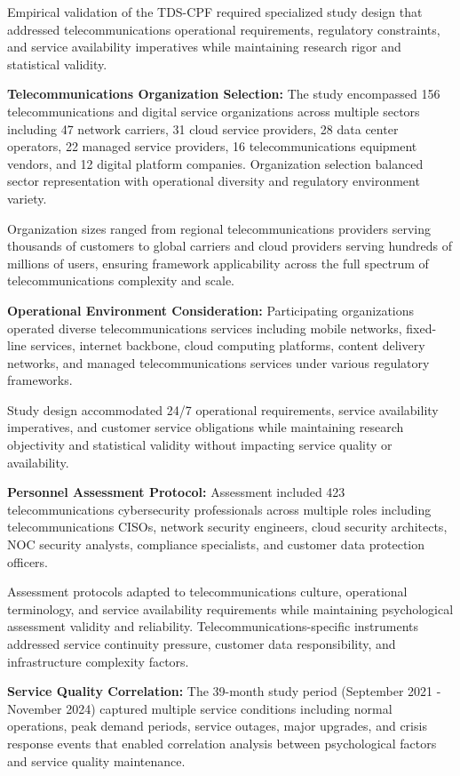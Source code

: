 \documentclass[10pt, twocolumn]{article}
\begin{document}
Empirical validation of the TDS-CPF required specialized study design that addressed telecommunications operational requirements, regulatory constraints, and service availability imperatives while maintaining research rigor and statistical validity.

\textbf{Telecommunications Organization Selection:} The study encompassed 156 telecommunications and digital service organizations across multiple sectors including 47 network carriers, 31 cloud service providers, 28 data center operators, 22 managed service providers, 16 telecommunications equipment vendors, and 12 digital platform companies. Organization selection balanced sector representation with operational diversity and regulatory environment variety.

Organization sizes ranged from regional telecommunications providers serving thousands of customers to global carriers and cloud providers serving hundreds of millions of users, ensuring framework applicability across the full spectrum of telecommunications complexity and scale.

\textbf{Operational Environment Consideration:} Participating organizations operated diverse telecommunications services including mobile networks, fixed-line services, internet backbone, cloud computing platforms, content delivery networks, and managed telecommunications services under various regulatory frameworks.

Study design accommodated 24/7 operational requirements, service availability imperatives, and customer service obligations while maintaining research objectivity and statistical validity without impacting service quality or availability.

\textbf{Personnel Assessment Protocol:} Assessment included 423 telecommunications cybersecurity professionals across multiple roles including telecommunications CISOs, network security engineers, cloud security architects, NOC security analysts, compliance specialists, and customer data protection officers.

Assessment protocols adapted to telecommunications culture, operational terminology, and service availability requirements while maintaining psychological assessment validity and reliability. Telecommunications-specific instruments addressed service continuity pressure, customer data responsibility, and infrastructure complexity factors.

\textbf{Service Quality Correlation:} The 39-month study period (September 2021 - November 2024) captured multiple service conditions including normal operations, peak demand periods, service outages, major upgrades, and crisis response events that enabled correlation analysis between psychological factors and service quality maintenance.
\end{document}
